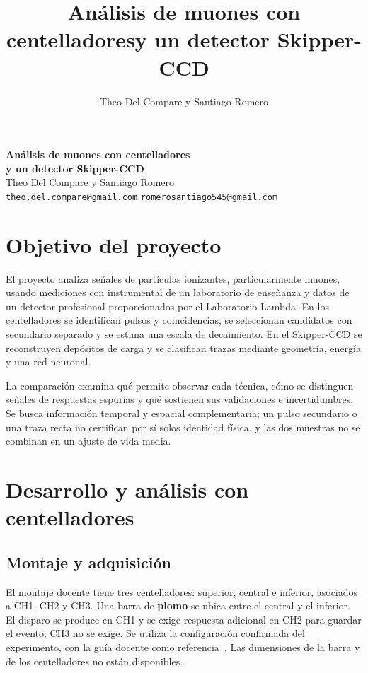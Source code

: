 \documentclass[10pt,a4paper]{article}
\title{\vspace{-1.2cm}\textbf{Análisis de muones con centelladores\newline y un detector Skipper-CCD}}
\author{Theo Del Compare y Santiago Romero}
\date{}
\begin{document}
\begin{center}
{\fontsize{16}{19}\selectfont\bfseries Análisis de muones con centelladores\\[2pt] y un detector Skipper-CCD}\\[5pt]
Theo Del Compare y Santiago Romero\\[2pt]
{\small \nolinkurl{theo.del.compare@gmail.com} \quad \nolinkurl{romerosantiago545@gmail.com}}
\end{center}
\vspace{-2mm}
\section{Objetivo del proyecto}
El proyecto analiza señales de partículas ionizantes, particularmente muones, usando mediciones con instrumental de un laboratorio de enseñanza y datos de un detector profesional proporcionados por el Laboratorio Lambda. En los centelladores se identifican pulsos y coincidencias, se seleccionan candidatos con secundario separado y se estima una escala de decaimiento. En el Skipper-CCD se reconstruyen depósitos de carga y se clasifican trazas mediante geometría, energía y una red neuronal.

La comparación examina qué permite observar cada técnica, cómo se distinguen señales de respuestas espurias y qué sostienen sus validaciones e incertidumbres. Se busca información temporal y espacial complementaria; un pulso secundario o una traza recta no certifican por sí solos identidad física, y las dos muestras no se combinan en un ajuste de vida media.

\section{Desarrollo y análisis con centelladores}

\subsection{Montaje y adquisición}
El montaje docente tiene tres centelladores: superior, central e inferior, asociados a CH1, CH2 y CH3. Una barra de \textbf{plomo} se ubica entre el central y el inferior. El disparo se produce en CH1 y se exige respuesta adicional en CH2 para guardar el evento; CH3 no se exige. Se utiliza la configuración confirmada del experimento, con la guía docente como referencia~\cite{guia}. Las dimensiones de la barra y de los centelladores no están disponibles.
\end{document}
